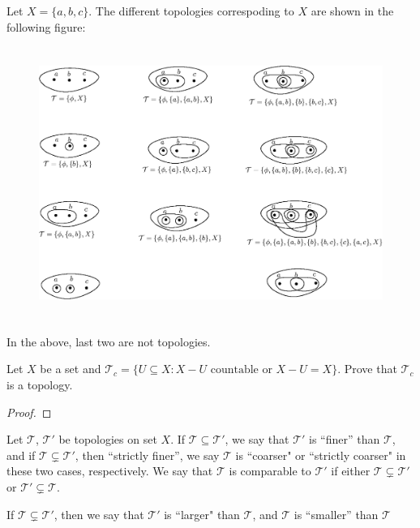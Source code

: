 \documentclass[a4paper,english,12pt]{article}   	%
\begin{document}
\begin{exmp} Let $X=\{a,b,c\}$. The different topologies correspoding to $X$ are shown in the following figure:
\begin{figure}[!h]
 \centering
 \includegraphics[height=3.5in]{fig133.eps}
\end{figure}

In the above, last two are not topologies.
\end{exmp}

\begin{exmp} 
 Let $X$ be a set and $\mathcal{T}_c=\{U\subseteq X: X-U \text{ countable or } X-U =X  \}$. Prove that $\mathcal{T}_c$ is a topology.
\end{exmp}
\begin{proof}
 
\end{proof}

\begin{defn}
 Let $\mathcal{T}$, $\mathcal{T}'$ be topologies on set $X$. If $\mathcal{T}\subseteq\mathcal{T}'$, we say that $\mathcal{T}'$ is ``finer'' than $\mathcal{T}$, and if  $\mathcal{T}\varsubsetneq\mathcal{T}'$, then ``strictly finer'', we say $\mathcal{T}$ is ``coarser" or ``strictly coarser" in these two cases, respectively. We say that $\mathcal{T}$ is comparable to $\mathcal{T}'$ if either
 $\mathcal{T}\varsubsetneq\mathcal{T}'$ or $\mathcal{T}' \varsubsetneq\mathcal{T}$.
\end{defn}
\begin{defn}
 If $\mathcal{T}\varsubsetneq\mathcal{T}'$, then we say that $\mathcal{T}'$ is ``larger" than $\mathcal{T}$, and $\mathcal{T}$ is ``smaller'' than $\mathcal{T}$
\end{defn}
\end{document}
